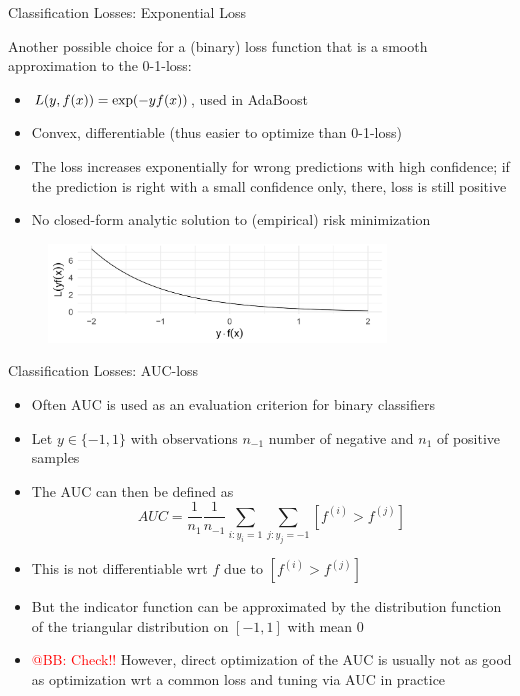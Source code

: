 \begin{vbframe}{Classification Losses: Exponential Loss}

Another possible choice for a (binary) loss function that is a smooth approximation to the 0-1-loss:
\begin{itemize}
\item $L(y, f(x)) = \exp(-yf(x))$, used in AdaBoost
\item Convex, differentiable (thus easier to optimize than 0-1-loss)
\item The loss increases exponentially for wrong predictions with high confidence; if the prediction is right with a small confidence only, there, loss is still positive
\item No closed-form analytic solution to (empirical) risk minimization
\end{itemize}


\begin{figure}
\includegraphics[width = 0.8\textwidth]{figure_man/exponential-loss.png}
\end{figure}

\end{vbframe}

\begin{vbframe}{Classification Losses: AUC-loss}

\begin{itemize}
\item Often AUC is used as an evaluation criterion for binary classifiers
\item Let $y \in \{-1, 1\}$ with observations $n_{-1}$ number of negative and $n_{1}$ of positive samples %
\item The AUC can then be defined as
$$AUC = \frac{1}{n_{1}} \frac{1}{n_{-1}} \sum_{i: y_i = 1} \sum_{j: y_j = -1} [f^{(i)} > f^{(j)}]$$
\item This is not differentiable wrt $f$ due to $[f^{(i)} > f^{(j)}]$
\item But the indicator function can be approximated by the distribution function of the triangular distribution on $[-1, 1]$ with mean $0$
\item \textcolor{red}{@BB: Check!!} However, direct optimization of the AUC is usually not as good as optimization wrt a common loss and tuning via AUC in practice 

\end{itemize}
\end{vbframe}





\endlecture

